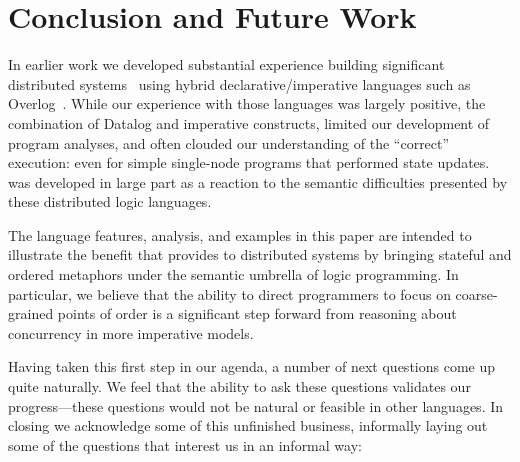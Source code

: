 \section{Conclusion and Future Work}
In earlier work we developed substantial experience building significant
distributed systems~\cite{boom-eurosys,netdb,Chu:2007,Loo2009-CACM} using hybrid
declarative/imperative languages such as Overlog~\cite{Loo2009-CACM}.
While our experience with those languages was largely positive, the 
combination of Datalog and imperative constructs, limited our development of program analyses, and often clouded our understanding of the ``correct'' execution: even for simple  single-node programs that performed state updates.  
\lang was developed in large part as a reaction to the semantic difficulties
presented by these distributed logic languages.

The language features, analysis, and examples in this paper are intended to illustrate the benefit that \lang provides to distributed systems by bringing stateful and ordered metaphors under the semantic umbrella of logic programming.  In particular, we believe that the ability to direct programmers to focus on coarse-grained points of order is a significant step forward from reasoning about concurrency in more imperative models.

Having taken this first step in our agenda, a number of next questions come up quite naturally.  We feel that the ability to ask these questions validates our progress---these questions would not be natural or feasible in other languages.  In closing we acknowledge some of this unfinished business, informally laying out some of the questions that interest us in an informal way:

